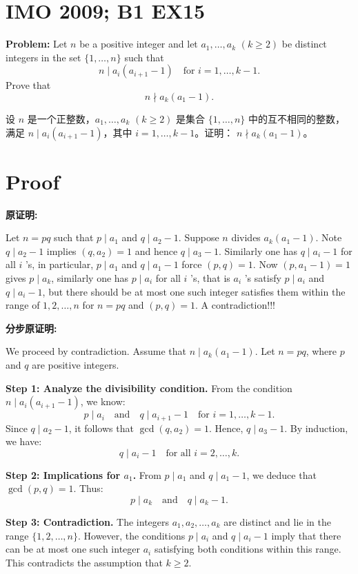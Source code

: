 \documentclass[a4paper]{article}
\begin{document}
\section*{IMO 2009; B1 EX15}
    \textbf{Problem:}
    Let $n$ be a positive integer and let $a_1,\ldots,a_k$ $(k \geq 2)$ be distinct integers in the set $\{1,\ldots,n\}$ such that 
    \[n \mid a_i(a_{i+1}-1) \quad \text{for } i = 1,\ldots,k-1.\]
    Prove that 
    \[n \nmid a_k(a_1-1).\]

    \[ \]
    设 $n$ 是一个正整数，$a_1, \ldots, a_k$ $(k \geq 2)$ 是集合 $\{1, \ldots, n\}$ 中的互不相同的整数，满足
    $n \mid a_i(a_{i+1}-1)$，其中 $i = 1, \ldots, k-1$。证明：
    $n \nmid a_k(a_1-1)$。


\section*{Proof}

    \textbf{原证明:}

    Let $n=pq$ such that $p\mid a_1$ and $q\mid a_2-1$.
    Suppose $n$ divides $a_k(a_1-1)$. Note $q\mid a_2-1$ implies $(q,a_2)=1$ and hence $q\mid a_3-1$. 
    Similarly one has $q\mid a_i-1$ for all $i$ 's, in particular, 
    $p\mid a_1$ and $q\mid a_1-1$ force $(p,q)=1$. 
    Now $(p,a_1-1)=1$ gives $p\mid a_k$, similarly one has $p\mid a_i$ for all $i$ 's, that is $a_i$ 's satisfy $p\mid a_i$ and $q\mid a_i-1$, 
    but there should be at most one such integer satisfies them within the range of $1,2,\ldots,n$ for $n=pq$ and $(p,q)=1$. 
    A contradiction!!!

    \[\]
    \textbf{分步原证明:}

    We proceed by contradiction. Assume that $n \mid a_k(a_1-1)$. Let $n = pq$, where $p$ and $q$ are positive integers.

    \textbf{Step 1: Analyze the divisibility condition.}  
    From the condition $n \mid a_i(a_{i+1}-1)$, we know:
    \[p \mid a_i \quad \text{and} \quad q \mid a_{i+1}-1 \quad \text{for } i = 1,\ldots,k-1.\]
    Since $q \mid a_2-1$, it follows that $\gcd(q, a_2) = 1$. Hence, $q \mid a_3-1$. By induction, we have:
    \[q \mid a_i-1 \quad \text{for all } i = 2,\ldots,k.\]

    \textbf{Step 2: Implications for $a_1$.}  
    From $p \mid a_1$ and $q \mid a_1-1$, we deduce that $\gcd(p, q) = 1$. Thus:
    \[p \mid a_k \quad \text{and} \quad q \mid a_k-1.\]

    \textbf{Step 3: Contradiction.}  
    The integers $a_1, a_2, \ldots, a_k$ are distinct and lie in the range $\{1, 2, \ldots, n\}$. 
    However, the conditions $p \mid a_i$ and $q \mid a_i-1$ imply that there can be at most one such integer $a_i$ satisfying both conditions within this range. 
    This contradicts the assumption that $k \geq 2$. 
\end{document}
